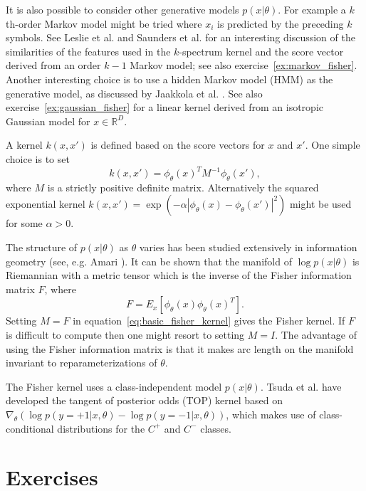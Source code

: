 \documentclass[11pt]{book}
\begin{document}
It is also possible to consider other generative models $p(x|\theta)$. For example a $k$th-order Markov model might be tried where $x_i$ is predicted by the preceding $k$ symbols. See Leslie et al. \cite{leslie2003} and Saunders et al. \cite{saunders2003} for an interesting discussion of the similarities of the features used in the $k$-spectrum kernel and the score vector derived from an order $k-1$ Markov model; see also exercise~\ref{ex:markov_fisher}. Another interesting choice is to use a hidden Markov model (HMM) as the generative model, as discussed by Jaakkola et al. \cite{jaakkola2000}. See also exercise~\ref{ex:gaussian_fisher} for a linear kernel derived from an isotropic Gaussian model for $x \in \mathbb{R}^D$.

A kernel $k(x, x')$ is defined based on the score vectors for $x$ and $x'$. One simple choice is to set
\begin{equation}
\label{eq:basic_fisher_kernel}
k(x, x') = \phi_\theta(x)^T M^{-1} \phi_\theta(x'),
\end{equation}
where $M$ is a strictly positive definite matrix. Alternatively the squared exponential kernel $k(x, x') = \exp(-\alpha|\phi_\theta(x) - \phi_\theta(x')|^2)$ might be used for some $\alpha > 0$.

The structure of $p(x|\theta)$ as $\theta$ varies has been studied extensively in information geometry (see, e.g. Amari \cite{amari1985}). It can be shown that the manifold of $\log p(x|\theta)$ is Riemannian with a metric tensor which is the inverse of the Fisher information matrix $F$, where
\begin{equation}
\label{eq:fisher_information}
F = E_x[\phi_\theta(x) \phi_\theta(x)^T].
\end{equation}
Setting $M = F$ in equation~\eqref{eq:basic_fisher_kernel} gives the Fisher kernel. If $F$ is difficult to compute then one might resort to setting $M = I$. The advantage of using the Fisher information matrix is that it makes arc length on the manifold invariant to reparameterizations of $\theta$.

The Fisher kernel uses a class-independent model $p(x|\theta)$. Tsuda et al. \cite{tsuda2002} have developed the tangent of posterior odds (TOP) kernel based on $\nabla_\theta(\log p(y = +1|x, \theta) - \log p(y = -1|x, \theta))$, which makes use of class-conditional distributions for the $C^+$ and $C^-$ classes.

\section{Exercises}
\label{sec:exercises}
\end{document}
